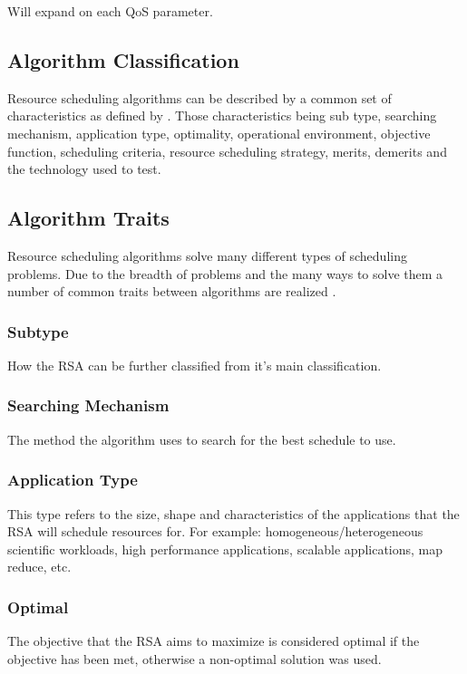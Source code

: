 \documentclass[fullapage,12pt]{article}
\begin{document}
Will expand on each QoS parameter.

\subsection{Algorithm Classification} \label{sub:algclassification}


Resource scheduling algorithms can be described by a common set of characteristics as defined by \textcite{Singh2016}. Those characteristics being sub type, searching mechanism, application type, optimality, operational environment, objective function, scheduling criteria, resource scheduling strategy, merits, demerits and the technology used to test.

\subsection{Algorithm Traits} \label{sub:algtraits}

Resource scheduling algorithms solve many different types of scheduling problems. Due to the breadth of problems and the many ways to solve them a number of common traits between algorithms are realized \cite{Singh2016}.

\subsubsection*{Subtype} How the RSA can be further classified from it's main classification.

\subsubsection*{Searching Mechanism} The method the algorithm uses to search for the best schedule to use.

\subsubsection*{Application Type} This type refers to the size, shape and characteristics of the applications that the RSA will schedule resources for. For example: homogeneous/heterogeneous scientific workloads, high performance applications, scalable applications, map reduce, etc.

\subsubsection*{Optimal} The objective that the RSA aims to maximize is considered optimal if the objective has been met, otherwise a non-optimal solution was used.
\end{document}
